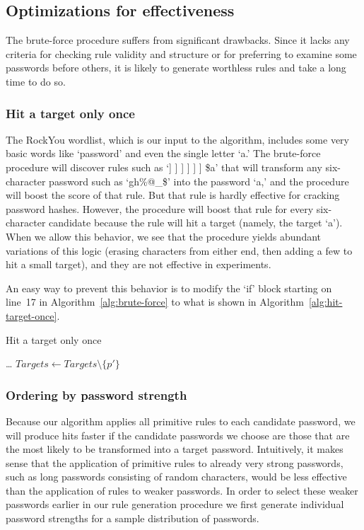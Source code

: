 \documentclass{article}
\begin{document}
\subsection{Optimizations for effectiveness}

The brute-force procedure suffers from significant drawbacks. Since it lacks
any criteria for checking rule validity and structure or for preferring to
examine some passwords before others, it is likely to generate worthless rules
and take a long time to do so.

\subsubsection{Hit a target only once}

The RockYou wordlist, which is our input to the algorithm, includes some very
basic words like `password' and even the single letter `a.' The brute-force
procedure will discover rules such as `] ] ] ] ] ] \$a' that will transform any
six-character password such as `gh\%@\_\$' into the password `a,' and the
procedure will boost the score of that rule. But that rule is hardly effective
for cracking password hashes. However, the procedure will boost that rule for
every six-character candidate because the rule will hit a target (namely, the
target `a'). When we allow this behavior, we see that the procedure yields
abundant variations of this logic (erasing characters from either end, then
adding a few to hit a small target), and they are not effective in experiments.

An easy way to prevent this behavior is to modify the `if' block starting on
line~17 in Algorithm~\ref{alg:brute-force} to what is shown in
Algorithm~\ref{alg:hit-target-once}.

\begin{algorithm}[h!]\caption{Hit a target only once}
\begin{algorithmic}
        \State \dots
      \EndFor
      \State $Targets \gets Targets \setminus \{p'\}$
    \EndIf
\end{algorithmic}
\label{alg:hit-target-once}
\end{algorithm}

\subsubsection{Ordering by password strength}

Because our algorithm applies all primitive rules to each candidate password,
we will produce hits faster if the candidate passwords we choose are those that
are the most likely to be transformed into a target password. Intuitively, it
makes sense that the application of primitive rules to already very strong
passwords, such as long passwords consisting of random characters, would be less
effective than the application of rules to weaker passwords. In order to select
these weaker passwords earlier in our rule generation procedure we first
generate individual password strengths for a sample distribution of passwords.
\end{document}
